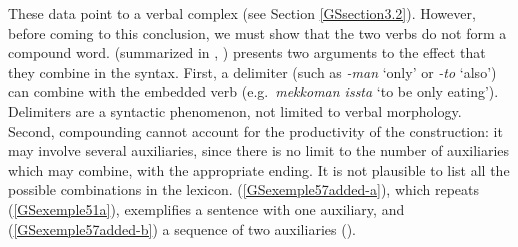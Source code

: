 {\eal
	\label{GSexemple56} 
	\label{GSexemple56a}

    \label{GSexemple56b}
\zl

These data point to a verbal complex (see Section \ref{GSsection3.2}). However, before coming to this conclusion, we must show that the two verbs do not form a compound word. \cite{no1991case} (summarized in \citealt{Chung98a-u}, \citealt{Kim2016a-u}) presents two arguments to the effect that they combine in the syntax. First, a delimiter (such as \emph{-man} `only' or \emph{-to} `also') can combine with the embedded verb (e.g.\ \emph{mekkoman issta} `to be only eating'). Delimiters are a syntactic phenomenon, not limited to verbal morphology. 
Second, compounding cannot account for the productivity of the construction: it may involve several auxiliaries, since there is no limit to the number of auxiliaries which may combine, with the appropriate ending. It is not plausible to list all the possible combinations in the lexicon. (\ref{GSexemple57added-a}), which repeats (\ref{GSexemple51a}), exemplifies a sentence with one auxiliary, and (\ref{GSexemple57added-b}) a sequence of two auxiliaries (\citealt[172]{Chung98a-u}).

\eal
	\label{GSexemple57added-ab}
	\label{GSexemple57added-a}
	
	\label{GSexemple57added-b}
\zl

}
